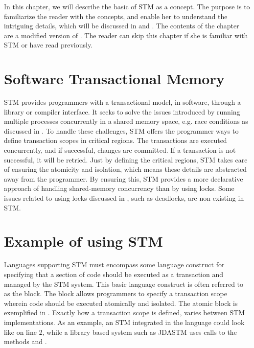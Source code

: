 \makeatletter {}\makeatother
{}
In this chapter, we will describe the basic of \ac{STM} as a concept. The purpose is to familiarize the reader with the concepts, and enable her to understand the intriguing details, which will be discussed in  and . The contents of the chapter are a modified version of \cite[p. 43-48]{dpt907e14trending}. The reader can skip this chapter if she is familiar with \ac{STM} or have read \cite[chap. 5]{dpt907e14trending} previously.
\label{chap:stm_key_concepts}

\section{Software Transactional Memory}
\ac{STM} provides programmers with a transactional model, in software, through a library or compiler interface\cite{herlihy2011tm}. It seeks to solve the issues introduced by running multiple processes concurrently in a shared memory space, e.g. race conditions as discussed in \cite[p. 22-26]{dpt907e14trending}. To handle these challenges, \ac{STM} offers the programmer ways to define transaction scopes in critical regions. The transactions are executed concurrently, and if successful, changes are committed. If a transaction is not successful, it will be retried. Just by defining the critical regions, \ac{STM} takes care of ensuring the atomicity and isolation, which means these details are abstracted away from the programmer\cite[p. 48]{harris2005composable}. By ensuring this, \ac{STM} provides a more declarative approach of handling shared-memory concurrency than by using locks. Some issues related to using locks discussed in \cite[p. 26-30]{dpt907e14trending}, such as deadlocks, are non existing in \ac{STM}.

\section{Example of using STM}
\label{sec:stm_keyconcepts_example}
Languages supporting \ac{STM} must encompass some language construct for specifying that a section of code should be executed as a transaction and managed by the \ac{STM} system. This basic language construct is often referred to as the  block\cite[p. 49]{harris2005composable}\cite[p. 3]{harris2003language}. The  block allows programmers to specify a transaction scope wherein code should be executed atomically and isolated. The atomic block is exemplified in . Exactly how a transaction scope is defined, varies between \ac{STM} implementations. As an example, an \ac{STM} integrated in the language could look like  on line 2, while a library based system such as JDASTM\cite{ramadan2009committing} uses calls to the methods  and .

